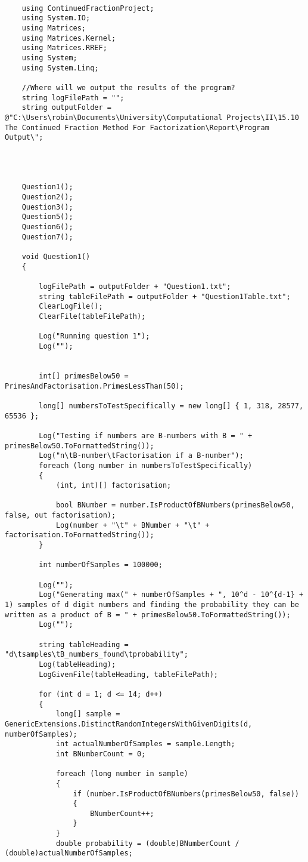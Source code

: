 \documentclass{article}
\begin{document}
\begin{lstlisting}
	
	using ContinuedFractionProject;
	using System.IO;
	using Matrices;
	using Matrices.Kernel;
	using Matrices.RREF;
	using System;
	using System.Linq;
	
	//Where will we output the results of the program?
	string logFilePath = "";
	string outputFolder = @"C:\Users\robin\Documents\University\Computational Projects\II\15.10 The Continued Fraction Method For Factorization\Report\Program Output\";
	
	
	
	
	Question1();
	Question2();
	Question3();
	Question5();
	Question6();
	Question7();
	
	void Question1()
	{
		
		logFilePath = outputFolder + "Question1.txt";
		string tableFilePath = outputFolder + "Question1Table.txt";
		ClearLogFile();
		ClearFile(tableFilePath);
		
		Log("Running question 1");
		Log("");
		
		
		int[] primesBelow50 = PrimesAndFactorisation.PrimesLessThan(50);
		
		long[] numbersToTestSpecifically = new long[] { 1, 318, 28577, 65536 };
		
		Log("Testing if numbers are B-numbers with B = " + primesBelow50.ToFormattedString());
		Log("n\tB-number\tFactorisation if a B-number");
		foreach (long number in numbersToTestSpecifically)
		{
			(int, int)[] factorisation;
			
			bool BNumber = number.IsProductOfBNumbers(primesBelow50, false, out factorisation);
			Log(number + "\t" + BNumber + "\t" + factorisation.ToFormattedString());
		}
		
		int numberOfSamples = 100000;
		
		Log("");
		Log("Generating max(" + numberOfSamples + ", 10^d - 10^{d-1} + 1) samples of d digit numbers and finding the probability they can be written as a product of B = " + primesBelow50.ToFormattedString());
		Log("");
		
		string tableHeading = "d\tsamples\tB_numbers_found\tprobability";
		Log(tableHeading);
		LogGivenFile(tableHeading, tableFilePath);
		
		for (int d = 1; d <= 14; d++)
		{
			long[] sample = GenericExtensions.DistinctRandomIntegersWithGivenDigits(d, numberOfSamples);
			int actualNumberOfSamples = sample.Length;
			int BNumberCount = 0;
			
			foreach (long number in sample)
			{
				if (number.IsProductOfBNumbers(primesBelow50, false))
				{
					BNumberCount++;
				}
			}
			double probability = (double)BNumberCount / (double)actualNumberOfSamples;
			

\end{lstlisting}
\end{document}

